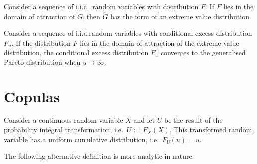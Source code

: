 
    \begin{theorem}
        Consider a sequence of i.i.d.~random variables with distribution $F$. If $F$ lies in the domain of attraction of $G$, then $G$ has the form of an extreme value distribution.
    \end{theorem}

    \begin{theorem}
        Consider a sequence of i.i.d.random variables with conditional excess distribution $F_u$. If the distribution $F$ lies in the domain of attraction of the extreme value distribution, the conditional excess distribution $F_u$ converges to the generalised Pareto distribution when $u\longrightarrow\infty$.
    \end{theorem}

\section{Copulas}

    \begin{property}
        Consider a continuous random variable $X$ and let $U$ be the result of the probability integral transformation, i.e.~$U:=F_X(X)$. This transformed random variable has a uniform cumulative distribution, i.e.~$F_U(u)=u$.
    \end{property}

    The following alternative definition is more analytic in nature.


